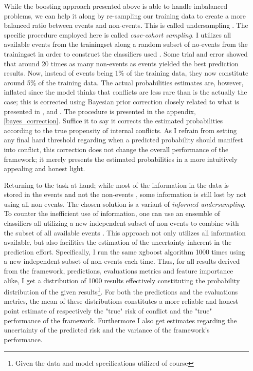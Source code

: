 \documentclass[a4paper]{article}
\begin{document}
While the boosting approach presented above is able to handle imbalanced problems, we can help it along by re-sampling our training data to create a more balanced ratio between events and non-events. This is called undersampling \citep[1266-1267]{He_2008}. The specific procedure employed here is called \emph{case-cohort sampling}. I utilizes all available events from the trainingset along a random subset of no-events from the trainingset in order to construct the classifiers used \citep[142]{King_Zeng_2001}. Some trial and error showed that around 20 times as many non-events as events yielded the best prediction results. Now, instead of events being 1\% of the training data, they now constitute around 5\% of the training data. The actual probabilities estimates are, however, inflated since the model thinks that conflicts are less rare than is the actually the case; this is corrected using Bayesian prior correction closely related to what is presented in \cite{King_Zeng_2001}, \cite{king_zeng_2001b} and \cite{Goldstone_2010}. The procedure is presented in the appendix, \autoref{bayes_correction}. Suffice it to say it corrects the estimated probabilities according to the true propensity of internal conflicts. As I refrain from setting any final hard threshold regarding when a predicted probability should manifest into conflict, this correction does not change the overall performance of the framework; it merely presents the estimated probabilities in a more intuitively appealing and honest light.\par

Returning to the task at hand; while most of the information in the data is stored in the events and not the non-events \cite[139]{King_Zeng_2001}, some information is still lost by not using all non-events. The chosen solution is a variant of \emph{informed undersampling}. To counter the inefficient use of information, one can use an ensemble of classifiers all utilizing a new independent subset of non-events to combine with the subset of all available events \cite[1267]{He_2008}. This approach not only utilizes all information available, but also facilities the estimation of the uncertainty inherent in the prediction effort. Specifically, I run the same xgboost algorithm 1000 times using a new independent subset of non-events each time. Thus, for all results derived from the framework, predictions, evaluations metrics and feature importance alike, I get a distribution of 1000 results effectively constituting the probability distribution of the given results\footnote{Given the data and model specifications utilized of course}. For both the predictions and the evaluations metrics, the mean of these distributions constitutes a more reliable and honest point estimate of respectively the "true" risk of conflict and the "true" performance of the framework. Furthermore I also get estimates regarding the uncertainty of the predicted risk and the variance of the framework's performance.\par
\end{document}

